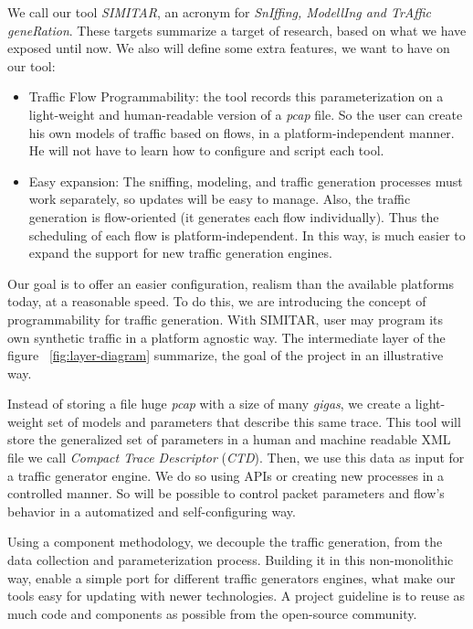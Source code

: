We call our  tool \textit{SIMITAR}, an acronym for \textit{SnIffing, ModellIng and TrAffic geneRation}.  These targets summarize a target of research, based on what we have exposed until now. We also will define some extra features, we want to have on our tool:

\begin{itemize}


\item Traffic Flow Programmability: the tool records this parameterization on a light-weight and human-readable version of a \textit{pcap} file. So the user can create his own models of traffic based on flows, in a platform-independent manner. He will not have to learn how to configure and script each tool.


\item Easy expansion: The sniffing, modeling, and traffic generation processes must work separately, so updates will be easy to manage. Also, the traffic generation is flow-oriented (it generates each flow individually). Thus the scheduling of each flow is platform-independent. In this way, is much easier to expand the support for new traffic generation engines.

\end{itemize}


Our goal is to offer an easier configuration, realism than the available platforms today, at a reasonable speed. To do this, we are introducing the concept of programmability for  traffic generation. With SIMITAR, user may program its own synthetic traffic in a platform agnostic way. The intermediate layer of the figure ~\ref{fig:layer-diagram} summarize, the goal of the project in an illustrative way.


Instead of storing a file huge \textit{pcap} with a size of many \textit{gigas}, we create a light-weight set of models and parameters that describe this same trace. This tool will store the generalized set of parameters in a human and machine readable XML file we call \textit{Compact Trace Descriptor} (\textit{CTD}). Then, we use this data as input for a traffic generator engine. We do so using APIs or creating new processes in a controlled manner. So will be possible to control packet parameters and flow's behavior in a automatized and self-configuring way.


Using a component methodology, we decouple the traffic generation, from the data collection and parameterization process. Building it in this non-monolithic way,  enable a simple port for different traffic generators engines, what make our tools easy for updating with newer technologies. A project guideline is to reuse as much code and components as possible from the open-source community.


